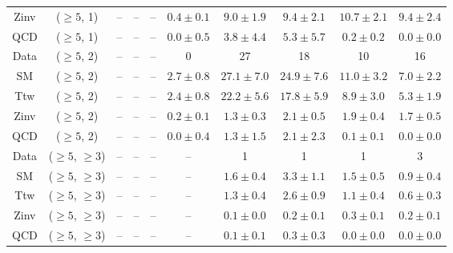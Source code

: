 \begin{table}[h!]
{\begin{tabular}{cccccccccc}
	Zinv & ($\ge5$, 1) & -- & -- & -- & $0.4\pm 0.1$ & $9.0\pm 1.9$ & $9.4\pm 2.1$ & $10.7\pm 2.1$ & $9.4\pm 2.4$ \\[0.5ex] 
	QCD & ($\ge5$, 1) & -- & -- & -- & $0.0\pm 0.5$ & $3.8\pm 4.4$ & $5.3\pm 5.7$ & $0.2\pm 0.2$ & $0.0\pm 0.0$ \\[0.5ex] 
	Data & ($\ge5$, 2) & -- & -- & -- & 0 & 27 & 18 & 10 & 16 \\[0.5ex] 
	SM & ($\ge5$, 2) & -- & -- & -- & $2.7\pm 0.8$ & $27.1\pm 7.0$ & $24.9\pm 7.6$ & $11.0\pm 3.2$ & $7.0\pm 2.2$ \\[0.5ex] 
	Ttw & ($\ge5$, 2) & -- & -- & -- & $2.4\pm 0.8$ & $22.2\pm 5.6$ & $17.8\pm 5.9$ & $8.9\pm 3.0$ & $5.3\pm 1.9$ \\[0.5ex] 
	Zinv & ($\ge5$, 2) & -- & -- & -- & $0.2\pm 0.1$ & $1.3\pm 0.3$ & $2.1\pm 0.5$ & $1.9\pm 0.4$ & $1.7\pm 0.5$ \\[0.5ex] 
	QCD & ($\ge5$, 2) & -- & -- & -- & $0.0\pm 0.4$ & $1.3\pm 1.5$ & $2.1\pm 2.3$ & $0.1\pm 0.1$ & $0.0\pm 0.0$ \\[0.5ex] 
	Data & ($\ge5$, $\ge3$) & -- & -- & -- & -- & 1 & 1 & 1 & 3 \\[0.5ex] 
	SM & ($\ge5$, $\ge3$) & -- & -- & -- & -- & $1.6\pm 0.4$ & $3.3\pm 1.1$ & $1.5\pm 0.5$ & $0.9\pm 0.4$ \\[0.5ex] 
	Ttw & ($\ge5$, $\ge3$) & -- & -- & -- & -- & $1.3\pm 0.4$ & $2.6\pm 0.9$ & $1.1\pm 0.4$ & $0.6\pm 0.3$ \\[0.5ex] 
	Zinv & ($\ge5$, $\ge3$) & -- & -- & -- & -- & $0.1\pm 0.0$ & $0.2\pm 0.1$ & $0.3\pm 0.1$ & $0.2\pm 0.1$ \\[0.5ex] 
	QCD & ($\ge5$, $\ge3$) & -- & -- & -- & -- & $0.1\pm 0.1$ & $0.3\pm 0.3$ & $0.0\pm 0.0$ & $0.0\pm 0.0$ \\[0.5ex] 
	\hline
	\hline
\end{tabular}}
\end{table}
